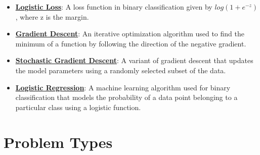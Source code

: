 \documentclass{article}%
\begin{document}
\begin{itemize}[leftmargin=*]
\item \href{\url{https://purdue.brightspace.com/d2l/common/assets/pdfjs-d2l-dist/1.0.14-legacy/web/viewer.html?file=\%252Fcontent\%252Fenforced\%252F1095467-wl.202510.CS.24300.001\%252F05L2-ML\%20Basics.pdf\%253Fou\%253D1095467\&lang=en-us\&container=d2l-fileviewer-rendered-pdf\&fullscreen=d2l-fileviewer-rendered-pdf-dialog\&height=667}#page=27}{\textbf{Logistic Loss}}: A loss function in binary classification given by $log(1 + e^{-z})$, where z is the margin.%
\item \href{\url{https://purdue.brightspace.com/d2l/common/assets/pdfjs-d2l-dist/1.0.14-legacy/web/viewer.html?file=\%252Fcontent\%252Fenforced\%252F1095467-wl.202510.CS.24300.001\%252F05L2-ML\%20Basics.pdf\%253Fou\%253D1095467\&lang=en-us\&container=d2l-fileviewer-rendered-pdf\&fullscreen=d2l-fileviewer-rendered-pdf-dialog\&height=667}#page=28}{\textbf{Gradient Descent}}: An iterative optimization algorithm used to find the minimum of a function by following the direction of the negative gradient.%
\item \href{\url{https://purdue.brightspace.com/d2l/common/assets/pdfjs-d2l-dist/1.0.14-legacy/web/viewer.html?file=\%252Fcontent\%252Fenforced\%252F1095467-wl.202510.CS.24300.001\%252F05L2-ML\%20Basics.pdf\%253Fou\%253D1095467\&lang=en-us\&container=d2l-fileviewer-rendered-pdf\&fullscreen=d2l-fileviewer-rendered-pdf-dialog\&height=667}#page=29}{\textbf{Stochastic Gradient Descent}}: A variant of gradient descent that updates the model parameters using a randomly selected subset of the data.%
\item \href{\url{https://purdue.brightspace.com/d2l/common/assets/pdfjs-d2l-dist/1.0.14-legacy/web/viewer.html?file=\%252Fcontent\%252Fenforced\%252F1095467-wl.202510.CS.24300.001\%252F05L2-ML\%20Basics.pdf\%253Fou\%253D1095467\&lang=en-us\&container=d2l-fileviewer-rendered-pdf\&fullscreen=d2l-fileviewer-rendered-pdf-dialog\&height=667}#page=31}{\textbf{Logistic Regression}}: A machine learning algorithm used for binary classification that models the probability of a data point belonging to a particular class using a logistic function.%
\end{itemize}

%
\section{Problem Types}%
\label{sec:ProblemTypes}%
\end{document}
